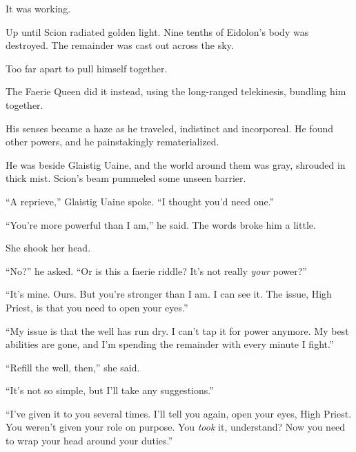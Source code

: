 It was working.



Up until Scion radiated golden light.  Nine tenths of Eidolon's body was destroyed.  The remainder was cast out across the sky.



Too far apart to pull himself together.



The Faerie Queen did it instead, using the long-ranged telekinesis, bundling him together.



His senses became a haze as he traveled, indistinct and incorporeal.  He found other powers, and he painstakingly rematerialized.



He was beside Glaistig Uaine, and the world around them was gray, shrouded in thick mist.  Scion's beam pummeled some unseen barrier.



``A reprieve,'' Glaistig Uaine spoke.  ``I thought you'd need one.''



``You're more powerful than I am,'' he said.  The words broke him a little.



She shook her head.



``No?'' he asked.  ``Or is this a faerie riddle?  It's not really \emph{your} power?''



``It's mine.  Ours.  But you're stronger than I am.  I can see it.  The issue, High Priest, is that you need to open your eyes.''



``My issue is that the well has run dry.  I can't tap it for power anymore.  My best abilities are gone, and I'm spending the remainder with every minute I fight.''



``Refill the well, then,'' she said.



``It's not so simple, but I'll take any suggestions.''



``I've given it to you several times.  I'll tell you again, open your eyes, High Priest.  You weren't given your role on purpose.  You \emph{took} it, understand?  Now you need to wrap your head around your duties.''



